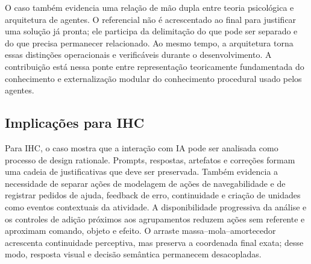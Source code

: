 \documentclass[preprint,12pt,authoryear]{elsarticle}
\begin{document}
O caso também evidencia uma relação de mão dupla entre teoria psicológica e arquitetura de agentes. O referencial não é acrescentado ao final para justificar uma solução já pronta; ele participa da delimitação do que pode ser separado e do que precisa permanecer relacionado. Ao mesmo tempo, a arquitetura torna essas distinções operacionais e verificáveis durante o desenvolvimento. A contribuição está nessa ponte entre representação teoricamente fundamentada do conhecimento e externalização modular do conhecimento procedural usado pelos agentes.

\subsection{Implicações para IHC}
Para IHC, o caso mostra que a interação com IA pode ser analisada como processo de design rationale. Prompts, respostas, artefatos e correções formam uma cadeia de justificativas que deve ser preservada. Também evidencia a necessidade de separar ações de modelagem de ações de navegabilidade e de registrar pedidos de ajuda, feedback de erro, continuidade e criação de unidades como eventos contextuais da atividade. A disponibilidade progressiva da análise e os controles de adição próximos aos agrupamentos reduzem ações sem referente e aproximam comando, objeto e efeito. O arraste massa--mola--amortecedor acrescenta continuidade perceptiva, mas preserva a coordenada final exata; desse modo, resposta visual e decisão semântica permanecem desacopladas.
\end{document}
